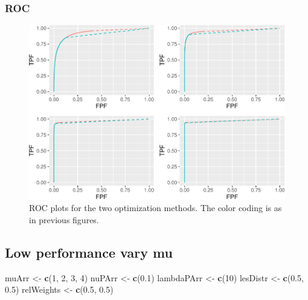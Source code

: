 \documentclass[
]{book}
\newenvironment{Shaded}{\begin{snugshade}}{\end{snugshade}}
\newcommand{\DecValTok}[1]{\textcolor[rgb]{0.00,0.00,0.81}{#1}}
\newcommand{\FloatTok}[1]{\textcolor[rgb]{0.00,0.00,0.81}{#1}}
\newcommand{\KeywordTok}[1]{\textcolor[rgb]{0.13,0.29,0.53}{\textbf{#1}}}
\newcommand{\NormalTok}[1]{#1}
\newcommand{\StringTok}[1]{\textcolor[rgb]{0.31,0.60,0.02}{#1}}
\begin{document}
\hypertarget{roc-5}{%
\subsubsection{ROC}\label{roc-5}}

\begin{figure}
\centering
\includegraphics{22-optim-op-point_files/figure-latex/optim-op-point-high-performance-vary-mu-vary-all-roc-1.pdf}
\caption{\label{fig:optim-op-point-high-performance-vary-mu-vary-all-roc}ROC plots for the two optimization methods. The color coding is as in previous figures.}
\end{figure}

\hypertarget{optim-op-point-low-performance-vary-mu}{%
\subsection{Low performance vary mu}\label{optim-op-point-low-performance-vary-mu}}

\begin{Shaded}
\begin{Highlighting}[]
\NormalTok{muArr <-}\StringTok{ }\KeywordTok{c}\NormalTok{(}\DecValTok{1}\NormalTok{, }\DecValTok{2}\NormalTok{, }\DecValTok{3}\NormalTok{, }\DecValTok{4}\NormalTok{)}
\NormalTok{nuPArr <-}\StringTok{ }\KeywordTok{c}\NormalTok{(}\FloatTok{0.1}\NormalTok{)}
\NormalTok{lambdaPArr <-}\StringTok{ }\KeywordTok{c}\NormalTok{(}\DecValTok{10}\NormalTok{)}
\NormalTok{lesDistr <-}\StringTok{ }\KeywordTok{c}\NormalTok{(}\FloatTok{0.5}\NormalTok{, }\FloatTok{0.5}\NormalTok{)}
\NormalTok{relWeights <-}\StringTok{ }\KeywordTok{c}\NormalTok{(}\FloatTok{0.5}\NormalTok{, }\FloatTok{0.5}\NormalTok{)}
\end{Highlighting}
\end{Shaded}
\end{document}
